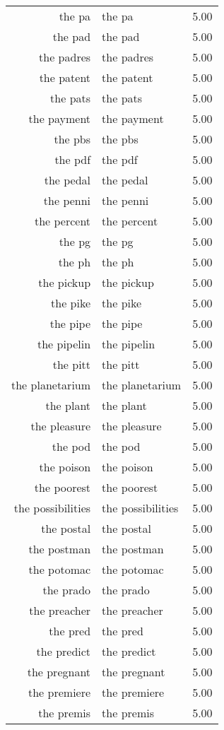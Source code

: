 \begin{table}[ht]
\begin{tabular}{rlr}
  the pa & the pa & 5.00 \\ 
  the pad & the pad & 5.00 \\ 
  the padres & the padres & 5.00 \\ 
  the patent & the patent & 5.00 \\ 
  the pats & the pats & 5.00 \\ 
  the payment & the payment & 5.00 \\ 
  the pbs & the pbs & 5.00 \\ 
  the pdf & the pdf & 5.00 \\ 
  the pedal & the pedal & 5.00 \\ 
  the penni & the penni & 5.00 \\ 
  the percent & the percent & 5.00 \\ 
  the pg & the pg & 5.00 \\ 
  the ph & the ph & 5.00 \\ 
  the pickup & the pickup & 5.00 \\ 
  the pike & the pike & 5.00 \\ 
  the pipe & the pipe & 5.00 \\ 
  the pipelin & the pipelin & 5.00 \\ 
  the pitt & the pitt & 5.00 \\ 
  the planetarium & the planetarium & 5.00 \\ 
  the plant & the plant & 5.00 \\ 
  the pleasure & the pleasure & 5.00 \\ 
  the pod & the pod & 5.00 \\ 
  the poison & the poison & 5.00 \\ 
  the poorest & the poorest & 5.00 \\ 
  the possibilities & the possibilities & 5.00 \\ 
  the postal & the postal & 5.00 \\ 
  the postman & the postman & 5.00 \\ 
  the potomac & the potomac & 5.00 \\ 
  the prado & the prado & 5.00 \\ 
  the preacher & the preacher & 5.00 \\ 
  the pred & the pred & 5.00 \\ 
  the predict & the predict & 5.00 \\ 
  the pregnant & the pregnant & 5.00 \\ 
  the premiere & the premiere & 5.00 \\ 
  the premis & the premis & 5.00 \\ 

\end{tabular}
\end{table}
